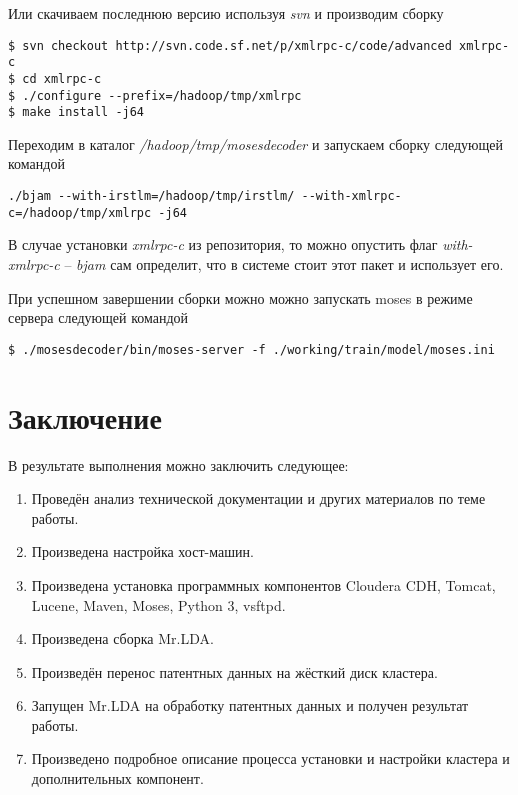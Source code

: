 Или скачиваем последнюю версию используя \emph{svn} и производим сборку
\begin{lstlisting}
$ svn checkout http://svn.code.sf.net/p/xmlrpc-c/code/advanced xmlrpc-c
$ cd xmlrpc-c
$ ./configure --prefix=/hadoop/tmp/xmlrpc
$ make install -j64
\end{lstlisting}

Переходим в каталог \emph{/hadoop/tmp/mosesdecoder} и запускаем сборку следующей командой
\begin{lstlisting}
./bjam --with-irstlm=/hadoop/tmp/irstlm/ --with-xmlrpc-c=/hadoop/tmp/xmlrpc -j64
\end{lstlisting}
В случае установки \emph{xmlrpc-c} из репозитория, то можно опустить флаг \emph{with-xmlrpc-c} -- 
\emph{bjam} сам определит, что в системе стоит этот пакет и использует его.

При успешном завершении сборки можно можно запускать moses в режиме сервера следующей командой
\begin{lstlisting}
$ ./mosesdecoder/bin/moses-server -f ./working/train/model/moses.ini
\end{lstlisting}

\newpage

\chapter{Заключение}
В результате выполнения можно заключить следующее:
\begin{enumerate}
    \item Проведён анализ технической документации и других материалов по теме работы.
    \item Произведена настройка хост-машин.
    \item Произведена установка программных компонентов Cloudera CDH, Tomcat, 
    Lucene, Maven, Moses, Python 3, vsftpd.
    \item Произведена сборка Mr.LDA.
    \item Произведён перенос патентных данных на жёсткий диск кластера.
    \item Запущен Mr.LDA на обработку патентных данных и получен результат работы.
    \item Произведено подробное описание процесса установки и настройки кластера и 
        дополнительных компонент.
\end{enumerate}

\newpage

